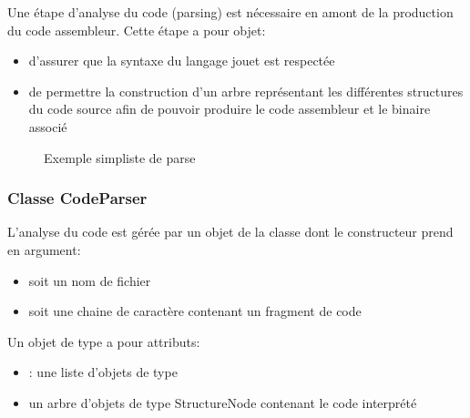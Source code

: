 	Une étape d'analyse du code (parsing) est nécessaire en amont de la production du code assembleur. Cette étape a pour objet:
\begin{itemize}
	\item d'assurer que la syntaxe du langage jouet est respectée
	\item de permettre la construction d'un arbre représentant les différentes structures du code source afin de pouvoir produire le code assembleur et le binaire associé
\end{itemize}

\begin{figure}[h!]
	\centering
	\caption{\label{fig:parse_exemple}Exemple simpliste de parse}
\end{figure}


\subsubsection{Classe CodeParser}

L'analyse du code est gérée par un objet de la classe  dont le constructeur prend en argument:
\begin{itemize}
	\item soit un nom de fichier 
	\item soit une chaine de caractère contenant un fragment de code 
\end{itemize}

Un objet de type  a pour attributs:
\begin{itemize}
	\item {}: une liste d'objets de type 
	\item {} un arbre d'objets de type StructureNode contenant le code interprété
\end{itemize}

